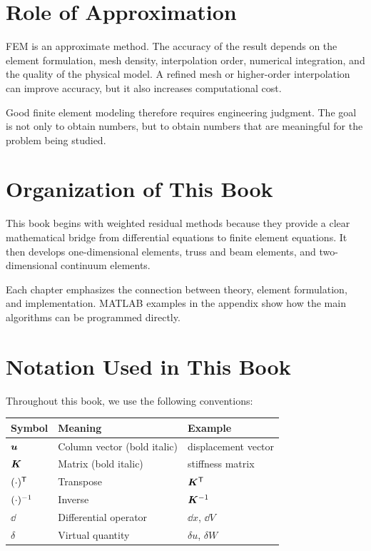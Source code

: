 \section{Role of Approximation}

FEM is an approximate method. The accuracy of the result depends on the element
formulation, mesh density, interpolation order, numerical integration, and the
quality of the physical model. A refined mesh or higher-order interpolation can
improve accuracy, but it also increases computational cost.

Good finite element modeling therefore requires engineering judgment. The goal
is not only to obtain numbers, but to obtain numbers that are meaningful for the
problem being studied.

\section{Organization of This Book}

This book begins with weighted residual methods because they provide a clear
mathematical bridge from differential equations to finite element equations. It
then develops one-dimensional elements, truss and beam elements, and
two-dimensional continuum elements.

Each chapter emphasizes the connection between theory, element formulation, and
implementation. MATLAB examples in the appendix show how the main algorithms
can be programmed directly.

\section{Notation Used in This Book}

Throughout this book, we use the following conventions:

\begin{center}
\begin{tabular}{@{}lll@{}}
    \toprule
    Symbol & Meaning & Example \\
    \midrule
    $\bm{u}$ & Column vector (bold italic) & displacement vector \\
    $\bm{K}$ & Matrix (bold italic) & stiffness matrix \\
    $(\cdot)^{\mathsf{T}}$ & Transpose & $\bm{K}^{\mathsf{T}}$ \\
    $(\cdot)^{-1}$ & Inverse & $\bm{K}^{-1}$ \\
    $\dd$ & Differential operator & $\dd x$, $\dd V$ \\
    $\delta$ & Virtual quantity & $\delta u$, $\delta W$ \\
    \bottomrule
\end{tabular}
\end{center}
